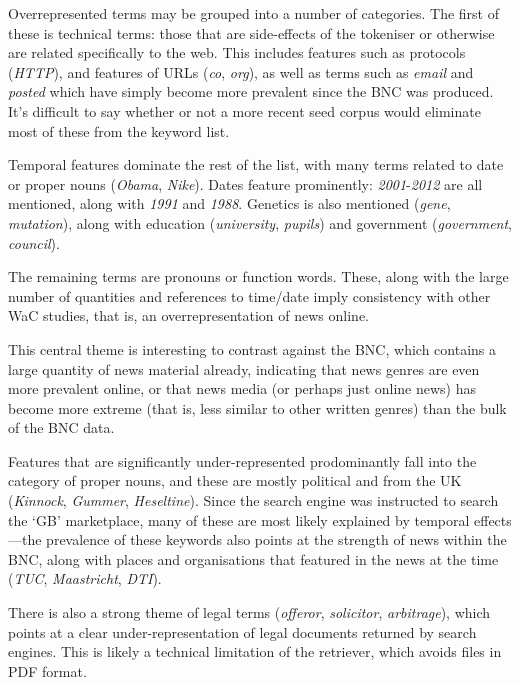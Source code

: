 Overrepresented terms may be grouped into a number of categories.  The first of these is technical terms: those that are side-effects of the tokeniser or otherwise are related specifically to the web.  This includes features such as protocols (\textsl{HTTP}), and features of URLs (\textsl{co}, \textsl{org}), as well as terms such as \textsl{email} and \textsl{posted} which have simply become more prevalent since the BNC was produced.  It's difficult to say whether or not a more recent seed corpus would eliminate most of these from the keyword list.

Temporal features dominate the rest of the list, with many terms related to date or proper nouns (\textsl{Obama}, \textsl{Nike}).  Dates feature prominently: \textsl{2001}-\textsl{2012} are all mentioned, along with \textsl{1991} and \textsl{1988}.  Genetics is also mentioned (\textsl{gene}, \textsl{mutation}), along with education (\textsl{university}, \textsl{pupils}) and government (\textsl{government}, \textsl{council}).

The remaining terms are pronouns or function words.  These, along with the large number of quantities and references to time/date imply consistency with other WaC studies, that is, an overrepresentation of news online.

This central theme is interesting to contrast against the BNC, which contains a large quantity of news material already, indicating that news genres are even more prevalent online, or that news media (or perhaps just online news) has become more extreme (that is, less similar to other written genres) than the bulk of the BNC data.

Features that are significantly under-represented prodominantly fall into the category of proper nouns, and these are mostly political and from the UK (\textsl{Kinnock}, \textsl{Gummer}, \textsl{Heseltine}).  Since the search engine was instructed to search the `GB' marketplace, many of these are most likely explained by temporal effects---the prevalence of these keywords also points at the strength of news within the BNC, along with places and organisations that featured in the news at the time (\textsl{TUC}, \textsl{Maastricht}, \textsl{DTI}).

There is also a strong theme of legal terms (\textsl{offeror}, \textsl{solicitor}, \textsl{arbitrage}), which points at a clear under-representation of legal documents returned by search engines.  This is likely a technical limitation of the retriever, which avoids files in PDF format.

